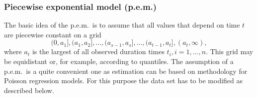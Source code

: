 \documentclass[11pt,a4paper,twoside]{bayesxarticle}
\begin{document}
\subsubsection{Piecewise exponential model (p.e.m.)}

The basic idea of the p.e.m.~is to assume that all values that
depend on time $t$ are piecewise constant on a grid
\[
(0,a_1],(a_1,a_2],\ldots,(a_{s-1},a_s],\ldots,(a_{t-1},a_t],(a_t,\infty),
\]
where $a_t$ is the largest of all observed duration times
$t_i,i=1,\ldots,n$. This grid may be equidistant or, for example,
according to quantiles. The assumption of a p.e.m.~is a quite
convenient one as estimation can be based on methodology for
Poisson regression models. For this purpose the data set has to be
modified as described below.
\end{document}
